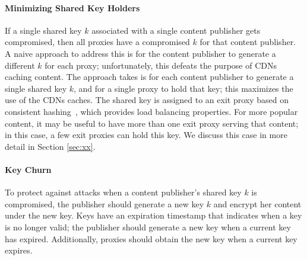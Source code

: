 \paragraph{Minimizing Shared Key Holders} If a single shared key $k$ associated with a single content publisher gets 
compromised, then all proxies have a compromised $k$ for that content publisher.  A naive approach to address this 
is for the content publisher to generate a different $k$ for each proxy; unfortunately, this defeats the purpose of 
CDNs caching content.  The approach \system{} takes is for each content publisher to generate a single shared key $k$, 
and for a single proxy to hold that key; this maximizes the use of the CDNs caches.  The shared key is assigned 
to an exit proxy based on consistent hashing~\cite{????}, which provides load balancing properties.  For more popular 
content, it may be useful to have more than one exit proxy serving that content; in this case, a few exit proxies can 
hold this key.  We discuss this case in more detail in Section \ref{sec:xx}.

\paragraph{Key Churn} To protect against attacks when a content publisher's shared key $k$ is compromised, the publisher
should generate a new key $k$ and encrypt her content under the new key.  Keys have an expiration timestamp that indicates 
when a key is no longer valid; the publisher should generate a new key when a current key has expired.  Additionally, 
proxies should obtain the new key when a current key expires.  


